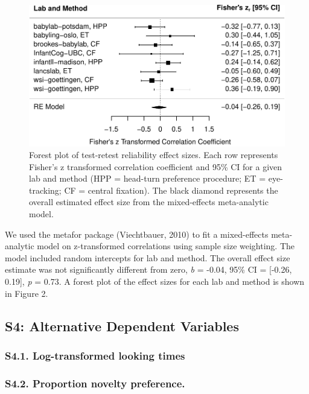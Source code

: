 \documentclass[
  man, donotrepeattitle,floatsintext]{apa6}
\begin{document}
\begin{figure}
\centering
\includegraphics{MB1T_supplement_files/figure-latex/fig2-1.pdf}
\caption{\label{fig:fig2}Forest plot of test-retest reliability effect sizes. Each row represents Fisher's z transformed correlation coefficient and 95\% CI for a given lab and method (HPP = head-turn preference procedure; ET = eye-tracking; CF = central fixation). The black diamond represents the overall estimated effect size from the mixed-effects meta-analytic model.}
\end{figure}

We used the metafor package (Viechtbauer, 2010) to fit a mixed-effects meta-analytic model on z-transformed correlations using sample size weighting. The model included random intercepts for lab and method. The overall effect size estimate was not significantly different from zero, \emph{b} = -0.04, 95\% CI = {[}-0.26, 0.19{]}, \emph{p} = 0.73. A forest plot of the effect sizes for each lab and method is shown in Figure 2.

\hypertarget{s4-alternative-dependent-variables}{%
\subsection{S4: Alternative Dependent Variables}\label{s4-alternative-dependent-variables}}

\hypertarget{s4.1.-log-transformed-looking-times}{%
\subsubsection{S4.1. Log-transformed looking times}\label{s4.1.-log-transformed-looking-times}}

\hypertarget{s4.2.-proportion-novelty-preference.}{%
\subsubsection{S4.2. Proportion novelty preference.}\label{s4.2.-proportion-novelty-preference.}}
\end{document}
